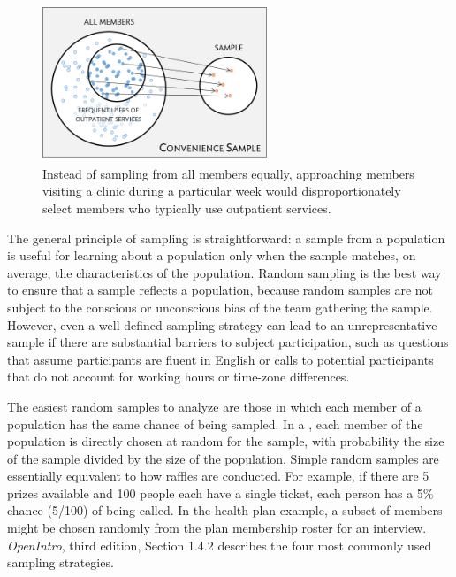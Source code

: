 \begin{figure}
	\centering
	\includegraphics[width=0.60\textwidth]{ch_intro_to_data_oi_biostat/figures/sampleHealthPlan/sampleConvenienceHealthPlan.png}
	\caption{Instead of sampling from all members equally, approaching members visiting a clinic during a particular week would disproportionately select members who typically use outpatient services.}
	\label{sampleConvenienceHealthPlan}
\end{figure}


The general principle of sampling is straightforward: a sample from a population is useful for learning about a population only when the sample matches, on average, the characteristics of the population. Random sampling is the best way to ensure that a sample reflects a population, because random samples are not subject to the conscious or unconscious bias of the team gathering the sample.  However, even a well-defined sampling strategy can lead to an unrepresentative sample if there are substantial barriers to subject participation, such as questions that assume participants are fluent in English or calls to potential participants that do not account for working hours or time-zone differences. 

The easiest random samples to analyze are those in which each member of a population has the same chance of being sampled. In a , each member of the population is directly chosen at random for the sample, with probability the size of the sample divided by the size of the population. Simple random samples are essentially equivalent to how raffles are conducted. For example, if there are 5 prizes available and 100 people each have a single ticket, each person has a 5\% chance (5/100) of being called. In the health plan example, a subset of members might be chosen randomly from the plan membership roster for an interview. \textsl{OpenIntro}, third edition, Section 1.4.2 describes the four most commonly used sampling strategies. 

